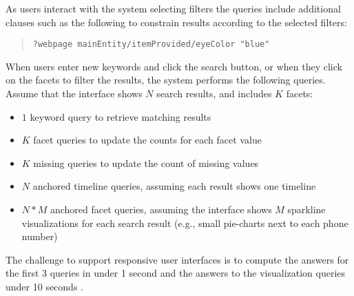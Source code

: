 As users interact with the system selecting filters the queries include additional clauses such as the following to constrain results according to the selected filters:
\begin{quote}
{\footnotesize
\begin{verbatim}
?webpage mainEntity/itemProvided/eyeColor "blue"
\end{verbatim}}
\end{quote}

When users enter new keywords and click the search button, or when they click on the facets to filter the results, the system performs the following queries.
Assume that the interface shows $N$ search results, and includes $K$ facets:
\begin{itemize}
\item $1$ keyword query to retrieve matching results
\item $K$ facet queries to update the counts for each facet value
\item $K$ missing queries to update the count of missing values
\item $N$ anchored timeline queries, assuming each result shows one timeline
\item $N*M$ anchored facet queries, assuming the interface shows $M$ sparkline visualizations for each search result (e.g., small pie-charts next to each phone number) 
\end{itemize}
The challenge to support responsive user interfaces is to compute the answers for the first 3 queries in under 1 second and the answers to the visualization queries under 10 seconds \cite{nielsen1994usability}.